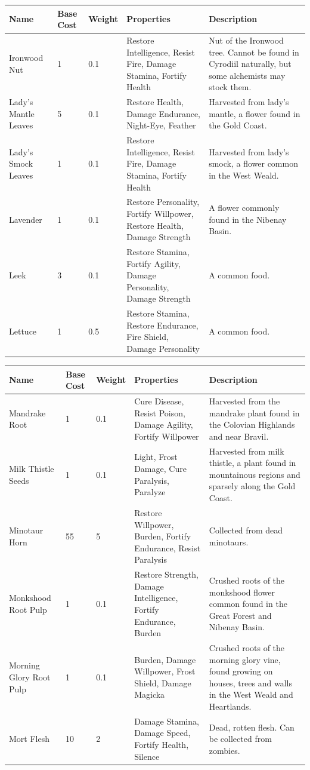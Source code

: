 \documentclass[12pt]{book}
\begin{document}
\begin{tabular}{|p{}|p{}|p{}|p{}|p{}|}
\hline
Name & Base Cost & Weight & Properties & Description\\ \hline
Ironwood Nut & 1 & 0.1 & Restore Intelligence, Resist Fire, Damage Stamina, Fortify Health & Nut of the Ironwood tree. Cannot be found in Cyrodiil naturally, but some alchemists may stock them.\\ \hline
Lady's Mantle Leaves & 5 & 0.1 & Restore Health, Damage Endurance, Night-Eye, Feather & Harvested from lady's mantle, a flower found in the Gold Coast.\\ \hline
Lady's Smock Leaves & 1 & 0.1 & Restore Intelligence, Resist Fire, Damage Stamina, Fortify Health & Harvested from lady's smock, a flower common in the West Weald.\\ \hline
Lavender & 1 & 0.1 & Restore Personality, Fortify Willpower, Restore Health, Damage Strength & A flower commonly found in the Nibenay Basin.\\ \hline
Leek & 3 & 0.1 & Restore Stamina, Fortify Agility, Damage Personality, Damage Strength & A common food.\\ \hline
Lettuce & 1 & 0.5 & Restore Stamina, Restore Endurance, Fire Shield, Damage Personality & A common food.\\ \hline
\end{tabular}

\begin{tabular}{|p{}|p{}|p{}|p{}|p{}|}
\hline
Name & Base Cost & Weight & Properties & Description\\ \hline
Mandrake Root & 1 & 0.1 & Cure Disease, Resist Poison, Damage Agility, Fortify Willpower & Harvested from the mandrake plant found in the Colovian Highlands and near Bravil.\\ \hline
Milk Thistle Seeds & 1 & 0.1 & Light, Frost Damage, Cure Paralysis, Paralyze & Harvested from milk thistle, a plant found in mountainous regions and sparsely along the Gold Coast.\\ \hline
Minotaur Horn & 55 & 5 & Restore Willpower, Burden, Fortify Endurance, Resist Paralysis & Collected from dead minotaurs.\\ \hline
Monkshood Root Pulp & 1 & 0.1 & Restore Strength, Damage Intelligence, Fortify Endurance, Burden & Crushed roots of the monkshood flower common found in the Great Forest and Nibenay Basin.\\ \hline
Morning Glory Root Pulp & 1 & 0.1 & Burden, Damage Willpower, Frost Shield, Damage Magicka & Crushed roots of the morning glory vine, found growing on houses, trees and walls in the West Weald and Heartlands.\\ \hline
Mort Flesh & 10 & 2 & Damage Stamina, Damage Speed, Fortify Health, Silence & Dead, rotten flesh. Can be collected from zombies.\\ \hline
\end{tabular}
\end{document}
